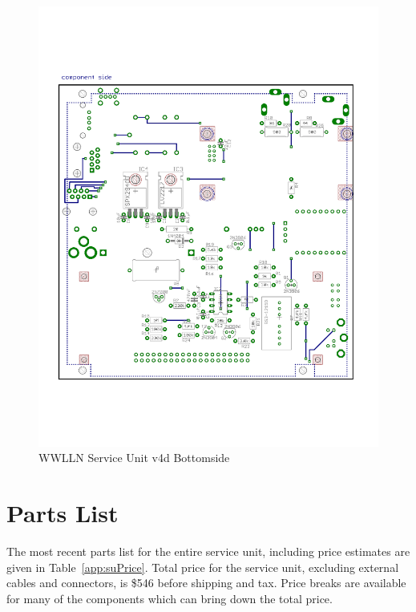 \begin{figure}[ht!]
   \centering
   \includegraphics[scale=.75]{Appendix/Figures/wwlln_SU_v4_bottom.pdf} 
   \caption{WWLLN Service Unit v4d Bottomside}
   \label{app:suBot}
\end{figure}

\section{Parts List}

The most recent parts list for the entire service unit, including price estimates are given in Table~\ref{app:suPrice}.
Total price for the service unit, excluding external cables and connectors, is \$546 before shipping and tax.
Price breaks are available for many of the components which can bring down the total price.

